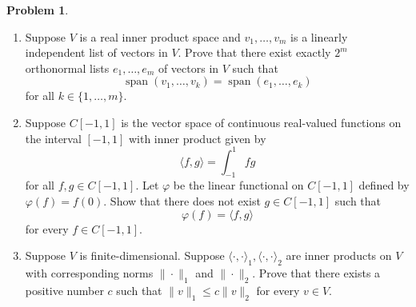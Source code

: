 \documentclass[12pt]{article}
\theoremstyle{definition}
\newtheorem{problem}{Problem}
\begin{document}
\clearpage
\begin{problem}
    \begin{enumerate}
        \item Suppose $V$ is a real inner product space and $v_1, \ldots, v_m$ is a linearly independent list of vectors in $V$. Prove that there exist exactly $2^m$ orthonormal lists $e_1, \ldots, e_m$ of vectors in $V$ such that
        $$
        \operatorname{span}\left(v_1, \ldots, v_k\right)=\operatorname{span}\left(e_1, \ldots, e_k\right)
        $$
        for all $k \in\{1, \ldots, m\}$.
        \item Suppose $C[-1,1]$ is the vector space of continuous real-valued functions on the interval $[-1,1]$ with inner product given by
        $$
        \langle f, g\rangle=\int_{-1}^1 f g
        $$
        for all $f, g \in C[-1,1]$. Let $\varphi$ be the linear functional on $C[-1,1]$ defined by $\varphi(f)=f(0)$. Show that there does not exist $g \in C[-1,1]$ such that
        $$
        \varphi(f)=\langle f, g\rangle
        $$
        for every $f \in C[-1,1]$.
        \item Suppose $V$ is finite-dimensional. Suppose $\langle\cdot, \cdot\rangle_1,\langle\cdot, \cdot\rangle_2$ are inner products on $V$ with corresponding norms $\|\cdot\|_1$ and $\|\cdot\|_2$. Prove that there exists a positive number $c$ such that $\|v\|_1 \leq c\|v\|_2$ for every $v \in V$.
    \end{enumerate}
\end{problem}
\end{document}
